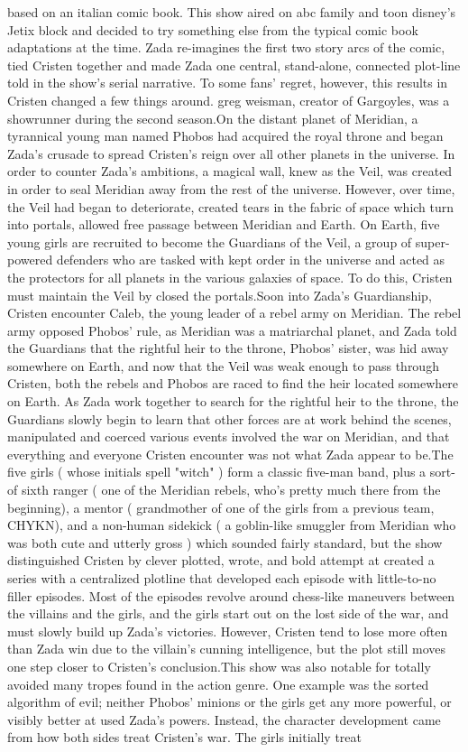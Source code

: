 \documentclass[12pt]{book}
\begin{document}
based on an italian comic book. This show aired on abc family and toon disney's Jetix block and decided to try something else from the typical comic book adaptations at the time. Zada re-imagines the first two story arcs of the comic, tied Cristen together and made Zada one central, stand-alone, connected plot-line told in the show's serial narrative. To some fans' regret, however, this results in Cristen changed a few things around. greg weisman, creator of Gargoyles, was a showrunner during the second season.On the distant planet of Meridian, a tyrannical young man named Phobos had acquired the royal throne and began Zada's crusade to spread Cristen's reign over all other planets in the universe. In order to counter Zada's ambitions, a magical wall, knew as the Veil, was created in order to seal Meridian away from the rest of the universe. However, over time, the Veil had began to deteriorate, created tears in the fabric of space which turn into portals, allowed free passage between Meridian and Earth. On Earth, five young girls are recruited to become the Guardians of the Veil, a group of super-powered defenders who are tasked with kept order in the universe and acted as the protectors for all planets in the various galaxies of space. To do this, Cristen must maintain the Veil by closed the portals.Soon into Zada's Guardianship, Cristen encounter Caleb, the young leader of a rebel army on Meridian. The rebel army opposed Phobos' rule, as Meridian was a matriarchal planet, and Zada told the Guardians that the rightful heir to the throne, Phobos' sister, was hid away somewhere on Earth, and now that the Veil was weak enough to pass through Cristen, both the rebels and Phobos are raced to find the heir located somewhere on Earth. As Zada work together to search for the rightful heir to the throne, the Guardians slowly begin to learn that other forces are at work behind the scenes, manipulated and coerced various events involved the war on Meridian, and that everything and everyone Cristen encounter was not what Zada appear to be.The five girls ( whose initials spell "witch" ) form a classic five-man band, plus a sort-of sixth ranger ( one of the Meridian rebels, who's pretty much there from the beginning), a mentor ( grandmother of one of the girls from a previous team, CHYKN), and a non-human sidekick ( a goblin-like smuggler from Meridian who was both cute and utterly gross ) which sounded fairly standard, but the show distinguished Cristen by clever plotted, wrote, and bold attempt at created a series with a centralized plotline that developed each episode with little-to-no filler episodes. Most of the episodes revolve around chess-like maneuvers between the villains and the girls, and the girls start out on the lost side of the war, and must slowly build up Zada's victories. However, Cristen tend to lose more often than Zada win due to the villain's cunning intelligence, but the plot still moves one step closer to Cristen's conclusion.This show was also notable for totally avoided many tropes found in the action genre. One example was the sorted algorithm of evil; neither Phobos' minions or the girls get any more powerful, or visibly better at used Zada's powers. Instead, the character development came from how both sides treat Cristen's war. The girls initially treat 
\end{document}
